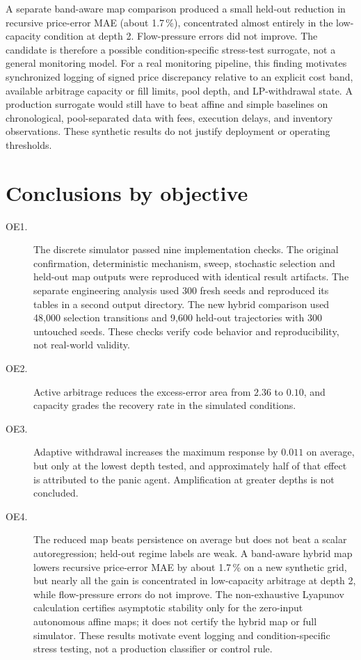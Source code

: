 A separate band-aware map comparison produced a small held-out reduction in recursive price-error MAE (about 1.7\,\%), concentrated almost entirely in the low-capacity condition at depth 2. Flow-pressure errors did not improve. The candidate is therefore a possible condition-specific stress-test surrogate, not a general monitoring model. For a real monitoring pipeline, this finding motivates synchronized logging of signed price discrepancy relative to an explicit cost band, available arbitrage capacity or fill limits, pool depth, and LP-withdrawal state. A production surrogate would still have to beat affine and simple baselines on chronological, pool-separated data with fees, execution delays, and inventory observations. These synthetic results do not justify deployment or operating thresholds.

\section{Conclusions by objective}

\begin{description}
  \item[OE1.] The discrete simulator passed nine implementation checks. The original confirmation, deterministic mechanism, sweep, stochastic selection and held-out map outputs were reproduced with identical result artifacts. The separate engineering analysis used 300 fresh seeds and reproduced its tables in a second output directory. The new hybrid comparison used 48,000 selection transitions and 9,600 held-out trajectories with 300 untouched seeds. These checks verify code behavior and reproducibility, not real-world validity.
  \item[OE2.] Active arbitrage reduces the excess-error area from $2.36$ to $0.10$, and capacity grades the recovery rate in the simulated conditions.
  \item[OE3.] Adaptive withdrawal increases the maximum response by $0.011$ on average, but only at the lowest depth tested, and approximately half of that effect is attributed to the panic agent. Amplification at greater depths is not concluded.
  \item[OE4.] The reduced map beats persistence on average but does not beat a scalar autoregression; held-out regime labels are weak. A band-aware hybrid map lowers recursive price-error MAE by about 1.7\,\% on a new synthetic grid, but nearly all the gain is concentrated in low-capacity arbitrage at depth 2, while flow-pressure errors do not improve. The non-exhaustive Lyapunov calculation certifies asymptotic stability only for the zero-input autonomous affine maps; it does not certify the hybrid map or full simulator. These results motivate event logging and condition-specific stress testing, not a production classifier or control rule.
\end{description}

